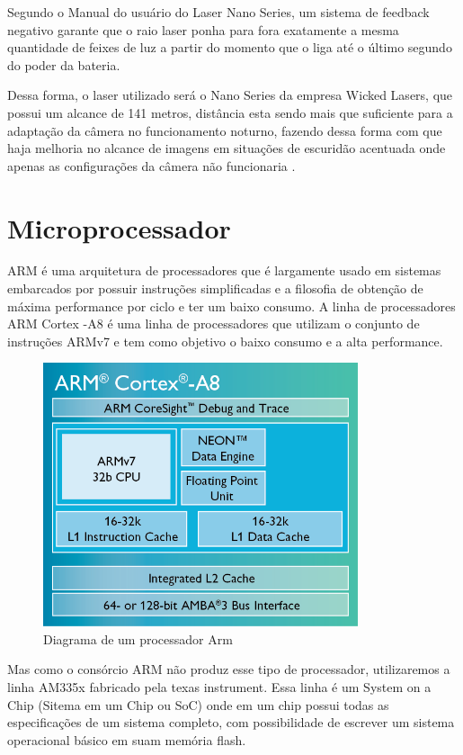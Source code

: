 Segundo o Manual do usuário do Laser Nano Series, um sistema de feedback negativo garante que o raio laser ponha para fora exatamente a mesma quantidade de feixes de luz a partir do momento que o liga até o último segundo do poder da bateria.

Dessa forma, o laser utilizado será o Nano Series da empresa Wicked Lasers, que possui um alcance de 141 metros, distância esta sendo mais que suficiente para a adaptação da câmera no funcionamento noturno, fazendo dessa forma com que haja melhoria no alcance de imagens em situações de escuridão acentuada onde apenas as configurações da câmera não funcionaria .

\section{Microprocessador}

ARM é uma arquitetura de processadores que é largamente usado em sistemas embarcados por possuir instruções simplificadas e a filosofia de obtenção de máxima performance por ciclo e ter um baixo consumo. A linha de processadores ARM Cortex -A8 é uma linha de processadores que utilizam o conjunto de instruções ARMv7 e tem como objetivo o baixo consumo e a alta performance.

\begin{figure}[h]
  \centering
  \includegraphics[width=350px, scale=1]{figuras/arm}
  \caption{Diagrama de um processador Arm}
\label{fig:arm}
\end{figure}

Mas como o consórcio ARM não produz esse tipo de processador, utilizaremos a linha AM335x fabricado pela texas instrument. Essa linha é um System on a Chip (Sitema em um Chip ou SoC) onde em um chip possui todas as especificações de um sistema completo, com possibilidade de escrever um sistema operacional básico em suam memória flash.

